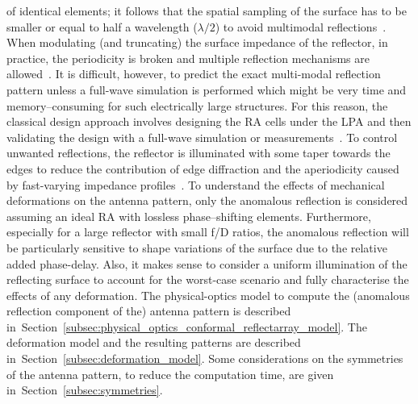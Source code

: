 \documentclass[11pt, a4paper]{scrartcl}
\newcommand{\sect}[1]{Section~\ref{#1}}
\begin{document}
    of identical elements; it follows that the spatial sampling of the surface has to be smaller or equal to half a
    wavelength ($\lambda/2$) to avoid multimodal reflections~\cite{MetaTutorialLiu2023}.
    When modulating (and truncating) the surface impedance of the reflector, in practice, the periodicity is broken and multiple
    reflection mechanisms are allowed~\cite{Esposti2022,NayeriRAbook}.
    It is difficult, however, to predict the exact multi-modal reflection pattern unless a full-wave simulation is
    performed which might be very time and memory--consuming for such electrically large structures.
    For this reason, the classical design approach involves designing the RA cells under the LPA and then validating the
    design with a full-wave simulation or measurements~\cite{NayeriRAbook,rapozar,PradoDatabase2022}.
    To control unwanted reflections, the reflector is illuminated with some taper towards the edges to reduce the contribution
    of edge diffraction and the aperiodicity caused by fast-varying impedance profiles~\cite{NayeriRAbook}.
    To understand the effects of mechanical deformations on the antenna pattern, only the anomalous reflection
    is considered assuming an ideal RA with lossless phase--shifting elements.
    Furthermore, especially for a large reflector with small f/D ratios, the anomalous reflection will be
    particularly sensitive to shape variations of the surface due to the relative added phase-delay.
    Also, it makes sense to consider a uniform illumination of the reflecting surface to account for the worst-case scenario
    and fully characterise the effects of any deformation.
    The physical-optics model to compute the (anomalous reflection component of the) antenna pattern is described in~\sect{subsec:physical_optics_conformal_reflectarray_model}.
    The deformation model and the resulting patterns are described in~\sect{subsec:deformation_model}.
    Some considerations on the symmetries of the antenna pattern, to reduce the computation time, are given in~\sect{subsec:symmetries}.
\end{document}
